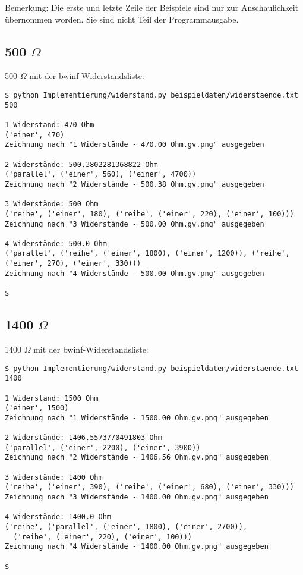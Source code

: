 \documentclass[a4paper,10pt,ngerman]{scrartcl}
\begin{document}
Bemerkung: Die erste und letzte Zeile der Beispiele sind nur zur Anschaulichkeit übernommen worden. Sie sind nicht Teil der Programmausgabe.
\subsection{500 $\Omega$}
500 $\Omega$ mit der bwinf-Widerstandsliste:

\begin{lstlisting}
$ python Implementierung/widerstand.py beispieldaten/widerstaende.txt 500

1 Widerstand: 470 Ohm
('einer', 470)
Zeichnung nach "1 Widerstände - 470.00 Ohm.gv.png" ausgegeben

2 Widerstände: 500.3802281368822 Ohm
('parallel', ('einer', 560), ('einer', 4700))
Zeichnung nach "2 Widerstände - 500.38 Ohm.gv.png" ausgegeben

3 Widerstände: 500 Ohm
('reihe', ('einer', 180), ('reihe', ('einer', 220), ('einer', 100)))
Zeichnung nach "3 Widerstände - 500.00 Ohm.gv.png" ausgegeben

4 Widerstände: 500.0 Ohm
('parallel', ('reihe', ('einer', 1800), ('einer', 1200)), ('reihe', ('einer', 270), ('einer', 330)))
Zeichnung nach "4 Widerstände - 500.00 Ohm.gv.png" ausgegeben

$
\end{lstlisting}



\subsection{1400 $\Omega$}
1400 $\Omega$ mit der bwinf-Widerstandsliste:

\begin{lstlisting}
$ python Implementierung/widerstand.py beispieldaten/widerstaende.txt 1400

1 Widerstand: 1500 Ohm
('einer', 1500)
Zeichnung nach "1 Widerstände - 1500.00 Ohm.gv.png" ausgegeben

2 Widerstände: 1406.5573770491803 Ohm
('parallel', ('einer', 2200), ('einer', 3900))
Zeichnung nach "2 Widerstände - 1406.56 Ohm.gv.png" ausgegeben

3 Widerstände: 1400 Ohm
('reihe', ('einer', 390), ('reihe', ('einer', 680), ('einer', 330)))
Zeichnung nach "3 Widerstände - 1400.00 Ohm.gv.png" ausgegeben

4 Widerstände: 1400.0 Ohm
('reihe', ('parallel', ('einer', 1800), ('einer', 2700)),
  ('reihe', ('einer', 220), ('einer', 100)))
Zeichnung nach "4 Widerstände - 1400.00 Ohm.gv.png" ausgegeben

$

\end{lstlisting}
\end{document}
